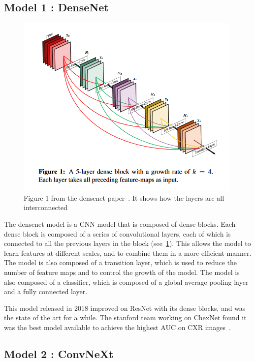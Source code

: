 \documentclass[11pt]{article}
\begin{document}
    \subsection{Model 1 : DenseNet~\cite{densenet}}


    \begin{figure}[h]

         \centering
         \includegraphics[width=0.5 \textwidth]{plots/densenet_figure}
         \caption{Figure 1 from the densenet paper~\cite{densenet}. It shows how the layers are all interconnected}
         \label{fig:densenet_figure}

    \end{figure}

        The densenet model is a CNN model that is composed of dense blocks. Each dense block is composed of a series of convolutional layers,
        each of which is connected to all the previous layers in the block (see~\ref{fig:densenet_figure}). This allows the model to learn features at different scales, and to
        combine them in a more efficient manner. The model is also composed of a transition layer, which is used to reduce the number of feature maps
        and to control the growth of the model. The model is also composed of a classifier, which is composed of a global average pooling layer and a fully connected layer.



        This model released in 2018 improved on ResNet with its dense blocks, and was the state of the art for a while. The stanford team working on ChexNet found it was the best model available to achieve the highest AUC on CXR images~\cite{chexnet}.


    \subsection{Model 2 : ConvNeXt~\cite{convnext}}
\end{document}
